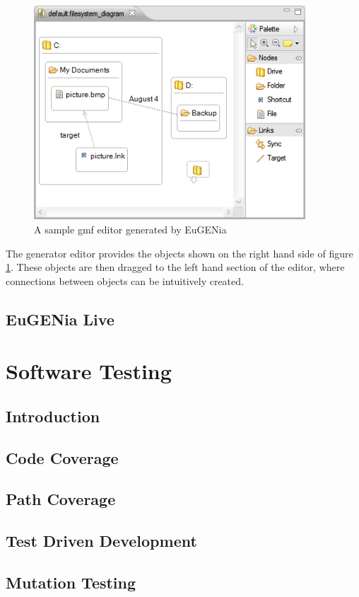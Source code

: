 \begin{figure}
\includegraphics[width=4in]{figures/gmfeditor.png}
\caption{A sample gmf editor generated by EuGENia \citep{eugeniaSite}}
\label{sampleGmf}
\end{figure}

The generator editor provides the objects shown on the right hand side of figure \ref{sampleGmf}. These objects are then dragged to the left hand section of the editor, where connections between objects can be intuitively created. 

\subsection{EuGENia Live}



\section{Software Testing}
\subsection{Introduction}
\subsection{Code Coverage}
\subsection{Path Coverage}
\subsection{Test Driven Development}
\subsection{Mutation Testing}


% 

